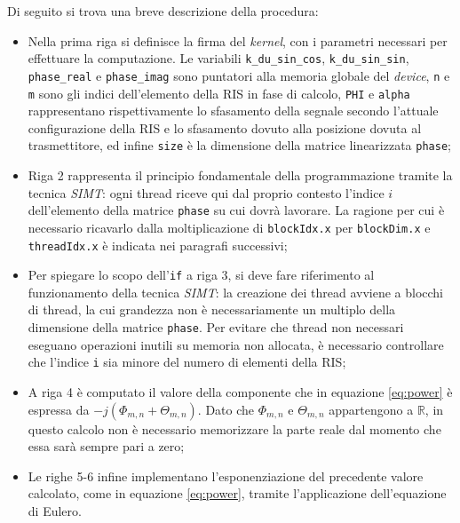 \vspace{1em}

\vspace{1em}

Di seguito si trova una breve descrizione della procedura:

\begin{itemize}
  \item Nella prima riga si definisce la firma del \textit{kernel}, con i parametri
    necessari per effettuare la computazione. Le variabili \texttt{k\_du\_sin\_cos},
    \texttt{k\_du\_sin\_sin}, \texttt{phase\_real} e \texttt{phase\_imag} sono
    puntatori alla memoria globale del \textit{device}, \texttt{n} e \texttt{m}
    sono gli indici dell'elemento della RIS in fase di calcolo, \texttt{PHI} e
    \texttt{alpha} rappresentano rispettivamente lo sfasamento della segnale secondo
    l'attuale configurazione della RIS e lo sfasamento dovuto alla posizione dovuta
    al trasmettitore, ed infine \texttt{size} è la dimensione della matrice linearizzata
    \texttt{phase};

  \item Riga 2 rappresenta il principio fondamentale della programmazione tramite
    la tecnica \textit{SIMT}: ogni thread riceve qui dal proprio contesto l'indice
    $i$ dell'elemento della matrice \texttt{phase} su cui dovrà lavorare. La ragione
    per cui è necessario ricavarlo dalla moltiplicazione di \texttt{blockIdx.x}
    per \texttt{blockDim.x} e \texttt{threadIdx.x} è indicata nei paragrafi
    successivi;

  \item Per spiegare lo scopo dell'\texttt{if} a riga 3, si deve fare riferimento
    al funzionamento della tecnica \textit{SIMT}: la creazione dei thread avviene
    a blocchi di thread, la cui grandezza non è necessariamente un multiplo
    della dimensione della matrice \texttt{phase}. Per evitare che thread non
    necessari eseguano operazioni inutili su memoria non allocata, è necessario controllare
    che l'indice \texttt{i} sia minore del numero di elementi della RIS;

  \item A riga 4 è computato il valore della componente che in equazione \ref{eq:power}
    è espressa da $-j(\Phi_{m,n}+\Theta_{m,n})$. Dato che $\Phi_{m,n}$ e
    $\Theta_{m,n}$ appartengono a $\mathbb{R}$, in questo calcolo non è necessario
    memorizzare la parte reale dal momento che essa sarà sempre pari a zero;

  \item Le righe 5-6 infine implementano l'esponenziazione del precedente valore
    calcolato, come in equazione \ref{eq:power}, tramite l'applicazione dell'equazione
    di Eulero.
\end{itemize}

